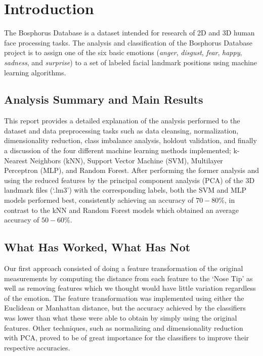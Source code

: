 \section{Introduction}

The Bosphorus Database is a dataset intended for research of 2D and 3D human face processing tasks. The analysis and classification of the Bosphorus Database project is to assign one of the six basic emotions (\textit{anger}, \textit{disgust}, \textit{fear}, \textit{happy}, \textit{sadness}, and \textit{surprise}) to a set of labeled facial landmark positions using machine learning algorithms.

\subsection{Analysis Summary and Main Results} \label{intro:analysis-summary-and-main-results}
This report provides a detailed explanation of the analysis performed to the dataset and data preprocessing tasks such as data cleansing, normalization, dimensionality reduction, class imbalance analysis, holdout validation, and finally a discussion of the four different machine learning methods implemented; k-Nearest Neighbors (kNN), Support Vector Machine (SVM), Multilayer Perceptron (MLP), and Random Forest. After performing the former analysis and using the reduced features by the principal component analysis (PCA) of the 3D landmark files (`.lm3') with the corresponding labels, both the SVM and MLP models performed best, consistently achieving an accuracy of $70-80\%$, in contrast to the kNN and Random Forest models which obtained an average accuracy of $50-60\%$.

\subsection{What Has Worked, What Has Not} \label{intro:what-has-worked-what-has-not}
Our first approach consisted of doing a feature transformation of the original measurements by computing the distance from each feature to the `Nose Tip' as well as removing features which we thought would have little variation regardless of the emotion. The feature transformation was implemented using either the Euclidean or Manhattan distance, but the accuracy achieved by the classifiers was lower than what these were able to obtain by simply using the original features. Other techniques, such as normalizing and dimensionality reduction with PCA, proved to be of great importance for the classifiers to improve their respective accuracies.

